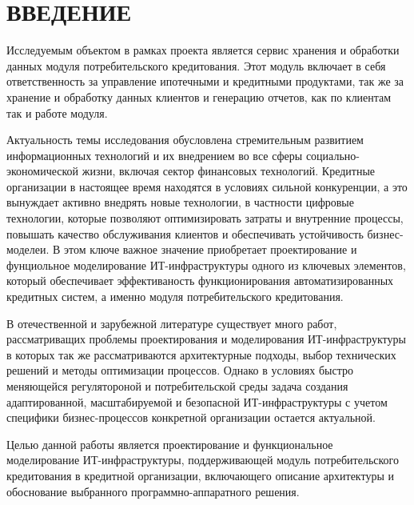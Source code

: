 \documentclass[14pt, a4paper]{extarticle}
\begin{document}
\def\contentsname{СОДЕРЖАНИЕ}

%   
%   

\setcounter{page}{1}
\tableofcontents

\section*{ВВЕДЕНИЕ}
{}

Исследуемым объектом в рамках проекта является сервис хранения и обработки
данных модуля потребительского кредитования. Этот модуль включает в
себя ответственность за управление ипотечными и кредитными продуктами, так же
за хранение и обработку данных клиентов и генерацию отчетов, как по клиентам
так и работе модуля.

Актуальность темы исследования обусловлена стремительным развитием информационных
технологий и их внедрением во все сферы социально-экономической жизни, включая сектор
финансовых технологий. Кредитные организации в настоящее время находятся в условиях 
сильной конкуренции, а это вынуждает активно внедрять новые технологии, в частности 
цифровые технологии, которые позволяют оптимизировать затраты и внутренние процессы, 
повышать качество обслуживания клиентов и обеспечивать устойчивость бизнес-моделеи.
В этом ключе важное значение приобретает проектирование и фунциольное моделирование
ИТ-инфраструктуры одного из ключевых элементов, который обеспечивает эффективаность
функционирования автоматизированных кредитных систем, а именно модуля потребительского 
кредитования.

В отечественной и зарубежной литературе существует много работ, рассматриващих
проблемы проектирования и моделирования ИТ-инфраструктуры в которых так же 
рассматриваются архитектурные подходы, выбор технических решений и методы оптимизации 
процессов. Однако в условиях быстро меняющейся регулятороной и потребительской среды 
задача создания адаптированной, масштабируемой и безопасной ИТ-инфраструктуры с учетом 
специфики бизнес-процессов конкретной организации остается актуальной.

Целью данной работы является проектирование и функциональное моделирование
ИТ-инфраструктуры, поддерживающей модуль потребительского кредитования в 
кредитной организации, включающего описание архитектуры и обоснование выбранного
программно-аппаратного решения.
\end{document}
